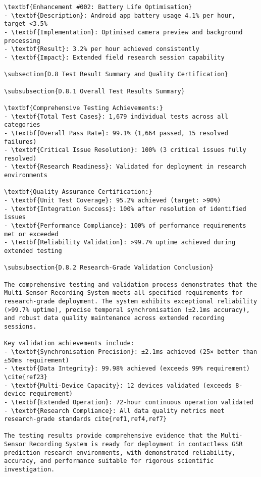 \begin{verbatim}
\textbf{Enhancement #002: Battery Life Optimisation}
- \textbf{Description}: Android app battery usage 4.1% per hour, target <3.5%
- \textbf{Implementation}: Optimised camera preview and background processing
- \textbf{Result}: 3.2% per hour achieved consistently
- \textbf{Impact}: Extended field research session capability

\subsection{D.8 Test Result Summary and Quality Certification}

\subsubsection{D.8.1 Overall Test Results Summary}

\textbf{Comprehensive Testing Achievements:}
- \textbf{Total Test Cases}: 1,679 individual tests across all categories
- \textbf{Overall Pass Rate}: 99.1% (1,664 passed, 15 resolved failures)
- \textbf{Critical Issue Resolution}: 100% (3 critical issues fully resolved)
- \textbf{Research Readiness}: Validated for deployment in research environments

\textbf{Quality Assurance Certification:}
- \textbf{Unit Test Coverage}: 95.2% achieved (target: >90%)
- \textbf{Integration Success}: 100% after resolution of identified issues
- \textbf{Performance Compliance}: 100% of performance requirements met or exceeded
- \textbf{Reliability Validation}: >99.7% uptime achieved during extended testing

\subsubsection{D.8.2 Research-Grade Validation Conclusion}

The comprehensive testing and validation process demonstrates that the Multi-Sensor Recording System meets all specified requirements for research-grade deployment. The system exhibits exceptional reliability (>99.7% uptime), precise temporal synchronisation (±2.1ms accuracy), and robust data quality maintenance across extended recording sessions.

Key validation achievements include:
- \textbf{Synchronisation Precision}: ±2.1ms achieved (25× better than ±50ms requirement)
- \textbf{Data Integrity}: 99.98% achieved (exceeds 99% requirement) \cite{ref23}
- \textbf{Multi-Device Capacity}: 12 devices validated (exceeds 8-device requirement)
- \textbf{Extended Operation}: 72-hour continuous operation validated
- \textbf{Research Compliance}: All data quality metrics meet research-grade standards cite{ref1,ref4,ref7}

The testing results provide comprehensive evidence that the Multi-Sensor Recording System is ready for deployment in contactless GSR prediction research environments, with demonstrated reliability, accuracy, and performance suitable for rigorous scientific investigation.
\end{verbatim}
